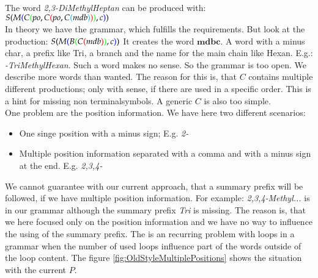 \documentclass[a4paper,10pt]{article}
\newcommand{\gerquot}[1]{\glqq#1\grqq}
\newcommand{\colorBracketFirstNesting}{black}
\newcommand{\colorBracketSecondNesting}{blue}
\newcommand{\colorBracketThirdNesting}{green}
\newcommand{\colorBracketFourthNesting}{red}
\newcommand{\colorBracketFifthNesting}{cyan}
\newcommand{\nonterminal}{non terminal}
\begin{document}
\noindent The word \emph{2,3-DiMethylHeptan} can be produced with:
$
S
{\color{\colorBracketFirstNesting}{(}}
    M
    {\color{\colorBracketSecondNesting}{(}}
        C
        {\color{\colorBracketThirdNesting}{(}}
            po,
            C
            {\color{\colorBracketFourthNesting}{(}}
                po,
                C
                {\color{\colorBracketFifthNesting}{(}}
                    mdb
                {\color{\colorBracketFifthNesting}{)}}
            {\color{\colorBracketFourthNesting}{)}}
        {\color{\colorBracketThirdNesting}{)}}
        , c
    {\color{\colorBracketSecondNesting}{)}}
{\color{\colorBracketFirstNesting}{)}}
$\\


In theory we have the grammar, which fulfills the requirements. But look at the production:
$
S
{\color{\colorBracketFirstNesting}{(}}
    M
    {\color{\colorBracketSecondNesting}{(}}
        B
        {\color{\colorBracketThirdNesting}{(}}
            C
            {\color{\colorBracketFourthNesting}{(}}
                mdb
            {\color{\colorBracketFourthNesting}{)}}
        {\color{\colorBracketThirdNesting}{)}}
        , c
    {\color{\colorBracketSecondNesting}{)}}
{\color{\colorBracketFirstNesting}{)}}
$
It creates the word $\textbf{mdbc}$. A word with a minus char, a prefix like \gerquot{Tri}, a branch and the name for the main chain like \gerquot{Hexan}. E.g.: \emph{-TriMethylHexan}. Such a word makes no sense. So the grammar is too open. We describe more words than wanted. The reason for this is, that $C$ contains multiple different productions; only with sense, if there are used in a specific order. This is a hint for missing \nonterminal symbols. A generic $C$ is also too simple.\\

\noindent One problem are the position information. We have here two different scenarios:
\begin{itemize}
    \item One singe position with a minus sign; E.g. \emph{2-}
    \item Multiple position information separated with a comma and with a minus sign at the end. E.g. \emph{2,3,4-}
\end{itemize}
We cannot guarantee with our current approach, that a summary prefix will be followed, if we have multiple position information. For example: \emph{2,3,4-Methyl...} is in our grammar although the summary prefix \emph{Tri} is missing. The reason is, that we here focused only on the position information and we have no way to influence the using of the summary prefix. The is an recurring problem with loops in a grammar when the number of used loops influence part of the words outside of the loop content. The figure \ref{fig:OldStyleMultiplePositions} shows the situation with the current $P$.
\end{document}

